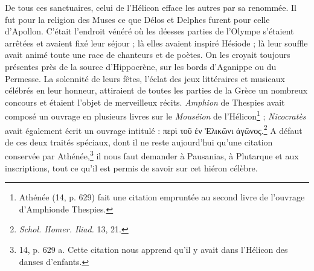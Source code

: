 \documentclass[landscape, a4paper, 11pt, oneside, polutonikogreek, french]{article}
\begin{document}
De tous ces sanctuaires, celui de l'Hélicon efface les autres par sa renommée. Il fut pour la religion des Muses ce que Délos et Delphes furent pour celle d'Apollon. C'était l'endroit vénéré où les déesses parties de l'Olympe s'étaient arrêtées et avaient fixé leur séjour ; là elles avaient inspiré Hésiode ; là leur souffle avait animé toute une race de chanteurs et de poètes. On les croyait toujours présentes près de la source d'Hippocrène, sur les bords d'Aganippe ou du Permesse. La solennité de leurs fêtes, l'éclat des jeux littéraires et musicaux célébrés en leur honneur, attiraient de toutes les parties de la Grèce un nombreux concours et étaient l'objet de merveilleux récits. \emph{Amphion} de Thespies avait composé un ouvrage en plusieurs livres sur le \emph{Mouséion} de l'Hélicon\footnote{Athénée (14, p. 629) fait une citation empruntée au second livre de l'ouvrage d'Amphionde Thespies.} ; \emph{Nicocratès} avait également écrit un ouvrage intitulé : περὶ τοῦ ἐν Ἑλικῶνι ἀγῶνος.\footnote{\emph{Schol. Homer. Iliad.} 13, 21.} A défaut de ces deux traités spéciaux, dont il ne reste aujourd'hui qu'une citation conservée par Athénée,\footnote{14, p. 629 a. Cette citation nous apprend qu'il y avait dans l'Hélicon des danses d'enfants.} il nous faut demander à Pausanias, à Plutarque et aux inscriptions, tout ce qu'il est permis de savoir sur cet hiéron célèbre.
\end{document}
